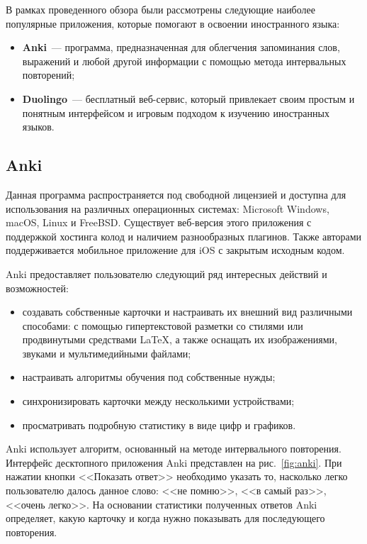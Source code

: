 В рамках проведенного обзора были рассмотрены следующие наиболее популярные приложения, которые помогают в освоении иностранного языка:

\begin{itemize}
\item \textbf{Anki}~--- программа, предназначенная для облегчения запоминания слов, выражений и любой другой информации с помощью метода интервальных повторений;
\item \textbf{Duolingo}~--- бесплатный веб-сервис, который привлекает своим простым и понятным интерфейсом и игровым подходом к изучению иностранных языков.
\end{itemize}

\subsection{Anki}

Данная программа распространяется под свободной лицензией и доступна для использования на различных операционных системах: Microsoft Windows, macOS, Linux и FreeBSD. Существует веб-версия этого приложения с поддержкой хостинга колод и наличием разнообразных плагинов. Также авторами поддерживается мобильное приложение для iOS с закрытым исходным кодом.

Anki предоставляет пользователю следующий ряд интересных действий и возможностей:

\begin{itemize}
	\item создавать собственные карточки и настраивать их внешний вид различными способами: с помощью гипертекстовой разметки со стилями или продвинутыми средствами \LaTeX{}, а также оснащать их изображениями, звуками и мультимедийными файлами;
	\item настраивать алгоритмы обучения под собственные нужды;
	\item синхронизировать карточки между несколькими устройствами;
	\item просматривать подробную статистику в виде цифр и графиков.
\end{itemize}

Anki использует алгоритм, основанный на методе интервального повторения. Интерфейс десктопного приложения Anki представлен на рис.~\ref{fig:anki}. При нажатии кнопки <<Показать ответ>> необходимо указать то, насколько легко пользователю далось данное слово: <<не помню>>, <<в самый раз>>, <<очень легко>>. На основании статистики полученных ответов Anki определяет, какую карточку и когда нужно показывать для последующего повторения.

